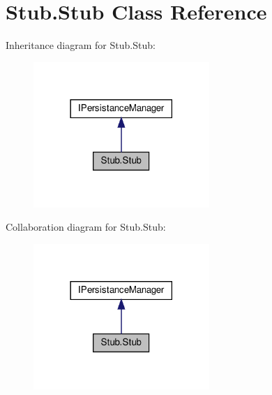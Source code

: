 \hypertarget{classStub_1_1Stub}{}\section{Stub.\+Stub Class Reference}
\label{classStub_1_1Stub}


Inheritance diagram for Stub.\+Stub\+:
\nopagebreak
\begin{figure}[H]
\begin{center}
\leavevmode
\includegraphics[width=189pt]{classStub_1_1Stub__inherit__graph}
\end{center}
\end{figure}


Collaboration diagram for Stub.\+Stub\+:
\nopagebreak
\begin{figure}[H]
\begin{center}
\leavevmode
\includegraphics[width=189pt]{classStub_1_1Stub__coll__graph}
\end{center}
\end{figure}
